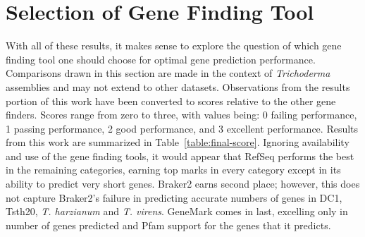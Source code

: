 \section{Selection of Gene Finding Tool}\label{chapter:conclusion}

With all of these results, it makes sense to explore the question of
which gene finding tool one should choose for optimal gene prediction
performance. Comparisons drawn in this section are made in the context
of \textit{Trichoderma} assemblies and may not extend to other
datasets. Observations from the results portion of this work have been
converted to scores relative to the other gene finders. Scores range
from zero to three, with values being: 0 \- failing performance, 1 \-
passing performance, 2 \- good performance, and 3 \- excellent
performance. Results from this work are summarized in Table~\ref{table:final-score}. Ignoring availability and use of the gene
finding tools, it would appear that RefSeq performs the best in the
remaining categories, earning top marks in every category except in
its ability to predict very short genes. Braker2 earns second place;
however, this does not capture Braker2's failure in predicting
accurate numbers of genes in DC1, Tsth20, \textit{T. harzianum} and
\textit{T. virens}. GeneMark comes in last, excelling only in number
of genes predicted and Pfam support for the genes that it predicts.

